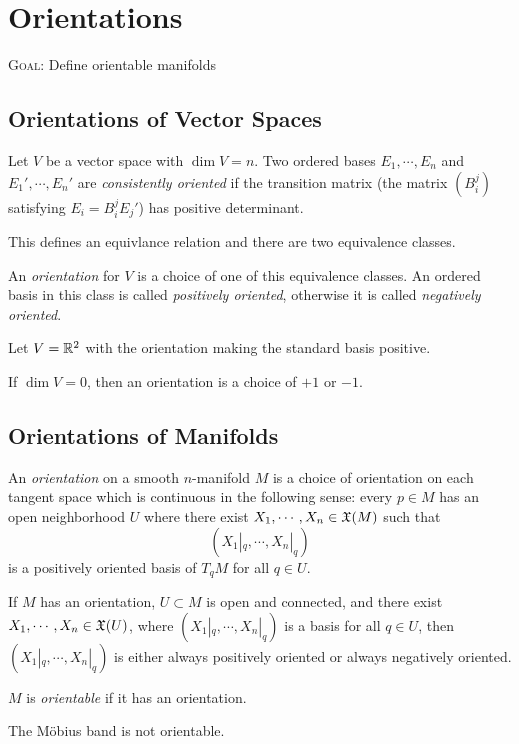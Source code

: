 \section{Orientations}
\textsc{Goal:} Define orientable manifolds

\subsection{Orientations of Vector Spaces}
Let $V$ be a vector space with $\dim V = n$. 
Two ordered bases $E_1,\cdots,E_n$ and $E_1',\cdots,E_n'$ are \textit{consistently oriented} if the transition matrix (the matrix $(B_i^j)$ satisfying $E_i = B_i^j E_j'$) has positive determinant. 
\begin{remark}
    This defines an equivlance relation and there are two equivalence classes.
\end{remark}
\begin{definition}
    An \textit{orientation} for $V$ is a choice of one of this equivalence classes. An ordered basis in this class is called \textit{positively oriented}, otherwise it is called \textit{negatively oriented}.
\end{definition}
\begin{example}
    Let $V=\mathbb{R}^2$ with the orientation making the standard basis positive. 
\end{example}
If $\dim V = 0$, then an orientation is a choice of $+1$ or $-1$. 
\subsection{Orientations of Manifolds}
\begin{definition}
    An \textit{orientation} on a smooth $n$-manifold $M$ is a choice of orientation on each tangent space which is continuous in the following sense:
    every $p \in M$ has an open neighborhood $U$ where there exist $X_1,\cdots,X_n \in \frak{X}(M)$ such that 
    $$(X_1|_q,\cdots,X_n|_q)$$ is a positively oriented basis of $T_qM$ for all $q \in U$. 
\end{definition}
\begin{remark}
If $M$ has an orientation, $U \subset M$ is open and connected, and there exist $X_1,\cdots,X_n \in \frak{X}(U)$, where 
$(X_1|_q,\cdots,X_n|_q)$ is a basis for all $q \in U$, then $(X_1|_q,\cdots,X_n|_q)$ is either always positively oriented or always negatively oriented.     
\end{remark}
\begin{definition}
    $M$ is \textit{orientable} if it has an orientation.  
\end{definition}
\begin{example}
    The M\"obius band is not orientable. 
\end{example}
